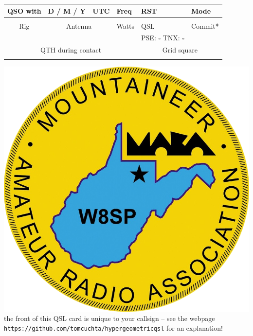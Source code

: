 \documentclass{article}
\begin{document}
\vspace*{0.01in}
\begin{center}
\begin{tabular}{|l|l|l|l|l|l|l|}
\hline
\multicolumn{2}{|c|}{QSO with} & D / M / Y & UTC & Freq & RST & Mode \\
\hline 
\multicolumn{2}{|c|}{\phantom{.....}} & & & & & \\
\hline
\multicolumn{2}{|c|}{Rig} & \multicolumn{2}{c|}{Antenna} & Watts & QSL & Commit* \\
\hline 
\multicolumn{2}{|c|}{\phantom{.....}} & \multicolumn{2}{c|}{\phantom{.}} &   & PSE: $\square$ TNX: $\square$ &  \\
\hline
\multicolumn{5}{|c|}{QTH during contact} & \multicolumn{2}{c|}{Grid square} \\ 
\hline 
\multicolumn{5}{|c|}{\phantom{.}} & \multicolumn{2}{c|}{\phantom{.}} \\
\hline
\end{tabular} 
\end{center}
\vfill
\hspace{5pt}\includegraphics[scale=0.3]{w8sp.png}\\
{\small *the front of this QSL card is unique to your callsign -- see the webpage \\ \texttt{https://github.com/tomcuchta/hypergeometricqsl} for an explanation!}
\end{document}
